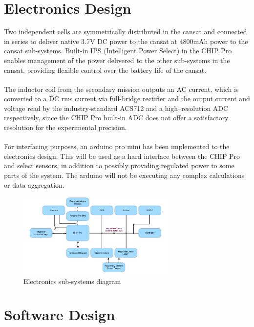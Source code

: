 \documentclass{report}
\begin{document}
	\section{Electronics Design}
		Two independent cells are symmetrically distributed in the cansat and
		connected in series to deliver native 3.7V DC power to the cansat at 
		4800mAh power to the cansat sub-systems.
		Built-in IPS (Intelligent Power Select) in the CHIP Pro enables management
		of the power delivered to the other sub-systems in the cansat, providing
		flexible control over the battery life of the cansat. 
		\\\\
		The inductor coil from the secondary mission outputs an AC current, which
		is converted to a DC rms current via full-bridge rectifier and the output
		current and voltage read by the industry-standard ACS712 and a 
		high--resolution ADC respectively, since the CHIP Pro built-in ADC 
		does not offer a satisfactory resolution for the experimental precision.
		\\\\
		{\color{blue}For interfacing purposes, an arduino pro mini has been
		implemented to the electronics design. This will be used as a hard interface
		between the CHIP Pro and select sensors, in addition to possibly providing
		regulated power to some parts of the system. The arduino will not be 
		executing any complex calculations or data aggregation.}
		
		\begin{figure}[H]
			\begin{center}
				\includegraphics[width=0.7\textwidth]{electronics}
			\end{center}
			\vspace{-15pt}
			\caption{Electronics sub-systems diagram}
		\end{figure}


	\section{Software Design}
\end{document}
